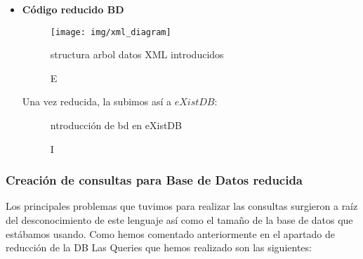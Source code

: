 \documentclass[12pt,a4paper]{article}
\begin{document}
\begin{itemize}
\item \textbf{Código reducido BD}



\begin{figure}[!h]
\centering
\texttt{[image: img/xml\_diagram]}
\caption Estructura arbol datos XML introducidos
\label{exit0}
\end{figure}


Una vez reducida, la subimos así a $eXistDB$:

\begin{figure}[!h]
\centering
{}
\caption Introducción de bd en eXistDB
\label{exit1}
\end{figure}



\end{itemize}

\newpage

\subsubsection{Creación de consultas para Base de Datos reducida} \label{pto422} 

Los principales problemas que tuvimos para realizar las consultas surgieron a raíz del desconocimiento de este lenguaje así como el tamaño de la base de datos que estábamos usando. Como hemos comentado anteriormente en el apartado de reducción de la DB
Las Queries que hemos realizado son las siguientes:
\end{document}
